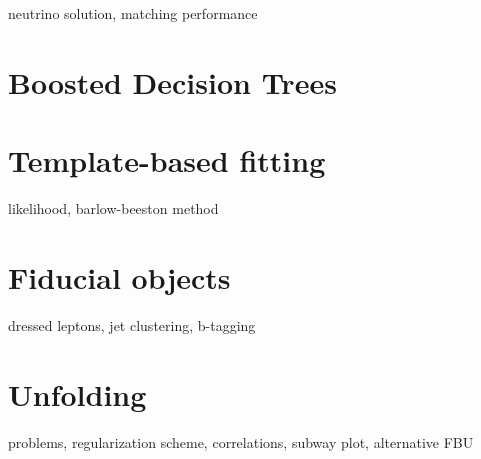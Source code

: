 neutrino solution, matching performance

\section{Boosted Decision Trees}
\cite{Hocker:2007ht}


\section{Template-based fitting}

likelihood, barlow-beeston method

\section{Fiducial objects}

dressed leptons, jet clustering, b-tagging

\section{Unfolding}

problems, regularization scheme, correlations, subway plot, alternative FBU
